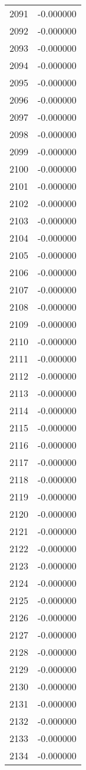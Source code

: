 \documentclass[12pt]{article}
\begin{document}
\begin{longtable}{@{}cc@{}}
2091 & -0.000000 \\
2092 & -0.000000 \\
2093 & -0.000000 \\
2094 & -0.000000 \\
2095 & -0.000000 \\
2096 & -0.000000 \\
2097 & -0.000000 \\
2098 & -0.000000 \\
2099 & -0.000000 \\
2100 & -0.000000 \\
2101 & -0.000000 \\
2102 & -0.000000 \\
2103 & -0.000000 \\
2104 & -0.000000 \\
2105 & -0.000000 \\
2106 & -0.000000 \\
2107 & -0.000000 \\
2108 & -0.000000 \\
2109 & -0.000000 \\
2110 & -0.000000 \\
2111 & -0.000000 \\
2112 & -0.000000 \\
2113 & -0.000000 \\
2114 & -0.000000 \\
2115 & -0.000000 \\
2116 & -0.000000 \\
2117 & -0.000000 \\
2118 & -0.000000 \\
2119 & -0.000000 \\
2120 & -0.000000 \\
2121 & -0.000000 \\
2122 & -0.000000 \\
2123 & -0.000000 \\
2124 & -0.000000 \\
2125 & -0.000000 \\
2126 & -0.000000 \\
2127 & -0.000000 \\
2128 & -0.000000 \\
2129 & -0.000000 \\
2130 & -0.000000 \\
2131 & -0.000000 \\
2132 & -0.000000 \\
2133 & -0.000000 \\
2134 & -0.000000 \\

\end{longtable}
\end{document}
